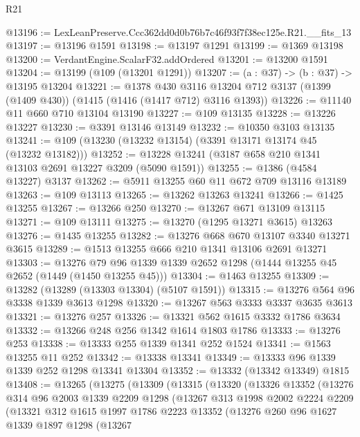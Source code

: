\begin{lexlean}{R21}
\begin{coremodule}
@13196 := LexLeanPreserve.Ccc362dd0d0b76b7c46f93f7f38ec125e.R21.__fits_13
@13197 := @13196 @1591
@13198 := @13197 @1291
@13199 := @1369 @13198
@13200 := VerdantEngine.ScalarF32.addOrdered
@13201 := @13200 @1591
@13204 := @13199 (@109 (@13201 @1291))
@13207 := (a : @37) -> (b : @37) -> @13195 @13204
@13221 := @1378
    @430
    @3116
    @13204
    @712
    @3137
    (@1399 (@1409 @430))
    (@1415 (@1416 (@1417 @712) @3116 @1393))
@13226 := @11140 @11 @660 @710 @13104 @13190
@13227 := @109 @13135
@13228 := @13226 @13227
@13230 := @3391 @13146 @13149
@13232 := @10350 @3103 @13135
@13241 := @109 (@13230 (@13232 @13154) (@3391 @13171 @13174 @45 (@13232 @13182)))
@13252 := @13228 @13241 (@3187 @658 @210 @1341 @13103 @2691 @13227 @3209 (@5090 @1591))
@13255 := @1386 (@4584 @13227) @3137
@13262 := @5911 @13255 @60 @11 @672 @709 @13116 @13189
@13263 := @109 @13113
@13265 := @13262 @13263 @13241
@13266 := @1425 @13255
@13267 := @13266 @250
@13270 := @13267 @671 @13109 @13115
@13271 := @109 @13111
@13275 := @13270 (@1295 @13271 @3615) @13263
@13276 := @1435 @13255
@13282 := @13276 @668 @670 @13107 @3340 @13271 @3615
@13289 := @1513 @13255 @666 @210 @1341 @13106 @2691 @13271
@13303 := @13276 @79 @96 @1339 @1339 @2652 @1298 (@1444 @13255 @45 @2652 (@1449 (@1450 @13255 @45)))
@13304 := @1463 @13255
@13309 := @13282 (@13289 (@13303 @13304) (@5107 @1591))
@13315 := @13276 @564 @96 @3338 @1339 @3613 @1298
@13320 := @13267 @563 @3333 @3337 @3635 @3613
@13321 := @13276 @257
@13326 := @13321 @562 @1615 @3332 @1786 @3634
@13332 := @13266 @248 @256 @1342 @1614 @1803 @1786
@13333 := @13276 @253
@13338 := @13333 @255 @1339 @1341 @252 @1524
@13341 := @1563 @13255 @11 @252
@13342 := @13338 @13341
@13349 := @13333 @96 @1339 @1339 @252 @1298 @13341 @13304
@13352 := @13332 (@13342 @13349) @1815
@13408 := @13265
    (@13275
      (@13309
        (@13315
          (@13320
            (@13326
              @13352
              (@13276
                @314
                @96
                @2003
                @1339
                @2209
                @1298
                (@13267
                  @313
                  @1998
                  @2002
                  @2224
                  @2209
                  (@13321
                    @312
                    @1615
                    @1997
                    @1786
                    @2223
                    @13352
                    (@13276
                      @260
                      @96
                      @1627
                      @1339
                      @1897
                      @1298
                      (@13267

\end{coremodule}
\end{lexlean}
